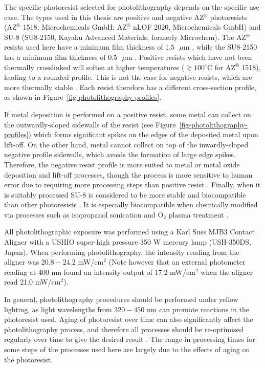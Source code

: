 \documentclass[
  a4paper,
]{scrbook}
\begin{document}
The specific photoresist selected for photolithography depends on the
specific use case. The types used in this thesis are positive and
negative AZ\(^\circledR\) photoresists (AZ\(^\circledR\) 1518,
Microchemicals GmbH; AZ\(^\circledR\) nLOF 2020, Microchemicals GmbH)
and SU-8 (SU8-2150, Kayaku Advanced Materials, formerly Microchem). The
AZ\(^\circledR\) resists used here have a minimum film thickness of
\(1.5\textrm{ } \mu \textrm{m}\) \autocite{Microchemicals}, while the
SU8-2150 has a minimum film thickness of
\(0.5\textrm{ } \mu \textrm{m}\) \autocite{Kayaku}. Positive resists
which have not been thermally crosslinked will soften at higher
temperatures (\(\gtrsim 100^\circ\)C for AZ\(^\circledR\) 1518), leading
to a rounded profile. This is not the case for negative resists, which
are more thermally stable \autocite{Microchemicals}. Each resist
therefore has a different cross-section profile, as shown in
Figure~\ref{fig-photolithography-profiles}.

If metal deposition is performed on a positive resist, some metal can
collect on the outwardly-sloped sidewalls of the resist (see
Figure~\ref{fig-photolithography-profiles}) which forms significant
spikes on the edges of the deposited metal upon lift-off. On the other
hand, metal cannot collect on top of the inwardly-sloped negative
profile sidewalls, which avoids the formation of large edge spikes.
Therefore, the negative resist profile is more suited to metal or metal
oxide deposition and lift-off processes, though the process is more
sensitive to human error due to requiring more processing steps than
positive resist \autocite{Microchemicals}. Finally, when it is suitably
processed SU-8 is considered to be more stable and biocompatible than
other photoresists \autocite{Albarghouthi2022}. It is especially
biocompatible when chemically modified via processes such as isopropanol
sonication and O\(_2\) plasma treatment \autocite{Chen2021}.

All photolithographic exposure was performed using a Karl Suss MJB3
Contact Aligner with a USHIO super-high pressure 350 W mercury lamp
(USH-350DS, Japan). When performing photolithography, the intensity
reading from the aligner was \(20.8-24.2\) mW/cm\(^2\) (Note however
that an external photometer reading at 400 nm found an intensity output
of 17.2 mW/cm\(^2\) when the aligner read 21.0 mW/cm\(^2\)).

In general, photolithography procedures should be performed under yellow
lighting, as light wavelengths from \(320-450\) nm can promote reactions
in the photoresist used. Aging of photoresist over time can also
significantly affect the photolithography process, and therefore all
processes should be re-optimised regularly over time to give the desired
result \autocite{Microchemicals}. The range in processing times for some
steps of the processes used here are largely due to the effects of aging
on the photoresist.
\end{document}

